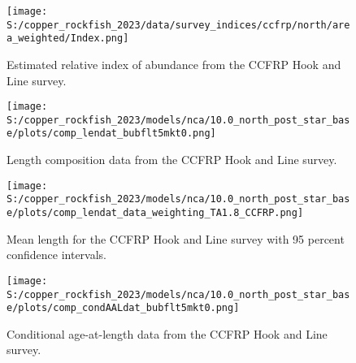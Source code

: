 \documentclass[11pt,
  letterpaper,
]{article}
\begin{document}
\begin{figure}
{\centering
\texttt{[image: S:/copper\_rockfish\_2023/data/survey\_indices/ccfrp/north/area\_weighted/Index.png]}
}
\caption{Estimated relative index of abundance from the CCFRP Hook and Line survey.\label{fig:ccfrp-index-main}}
\end{figure}

\pagebreak

\begin{figure}
{\centering
\texttt{[image: S:/copper\_rockfish\_2023/models/nca/10.0\_north\_post\_star\_base/plots/comp\_lendat\_bubflt5mkt0.png]}
}
\caption{Length composition data from the CCFRP Hook and Line survey.\label{fig:ccfrp-len-data}}
\end{figure}

\pagebreak

\begin{figure}
{\centering
\texttt{[image: S:/copper\_rockfish\_2023/models/nca/10.0\_north\_post\_star\_base/plots/comp\_lendat\_data\_weighting\_TA1.8\_CCFRP.png]}
}
\caption{Mean length for the CCFRP Hook and Line survey with 95 percent confidence intervals.\label{fig:ccfrp-mean-len-data}}
\end{figure}

\pagebreak

\begin{figure}
{\centering
\texttt{[image: S:/copper\_rockfish\_2023/models/nca/10.0\_north\_post\_star\_base/plots/comp\_condAALdat\_bubflt5mkt0.png]}
}
\caption{Conditional age-at-length data from the CCFRP Hook and Line survey.\label{fig:ccfrp-age-data}}
\end{figure}

\pagebreak

\pagebreak

\pagebreak

\pagebreak

\pagebreak

\pagebreak
\end{document}
